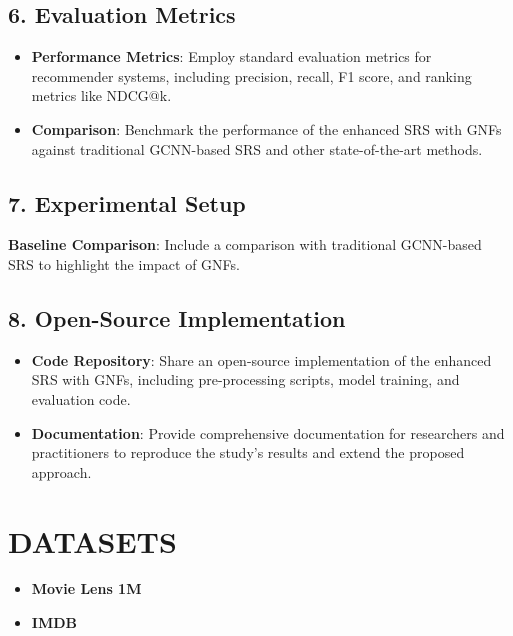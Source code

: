 \documentclass[journal]{IEEEtran}
\begin{document}
\subsection*{6. Evaluation Metrics}

\begin{itemize}
  \item \textbf{Performance Metrics}: Employ standard evaluation metrics for recommender systems, including precision, recall, F1 score, and ranking metrics like NDCG@k.
  \item \textbf{Comparison}: Benchmark the performance of the enhanced SRS with GNFs against traditional GCNN-based SRS and other state-of-the-art methods.
\end{itemize}

\subsection*{7. Experimental Setup}

\textbf{Baseline Comparison}: Include a comparison with traditional GCNN-based SRS to highlight the impact of GNFs.

\subsection*{8. Open-Source Implementation}

\begin{itemize}
  \item \textbf{Code Repository}: Share an open-source implementation of the enhanced SRS with GNFs, including pre-processing scripts, model training, and evaluation code.
  \item \textbf{Documentation}: Provide comprehensive documentation for researchers and practitioners to reproduce the study's results and extend the proposed approach.
\end{itemize}



\section{DATASETS}

\begin{itemize}
  \item \textbf{Movie Lens 1M}
  \item \textbf{IMDB}
\end{itemize}
\end{document}
